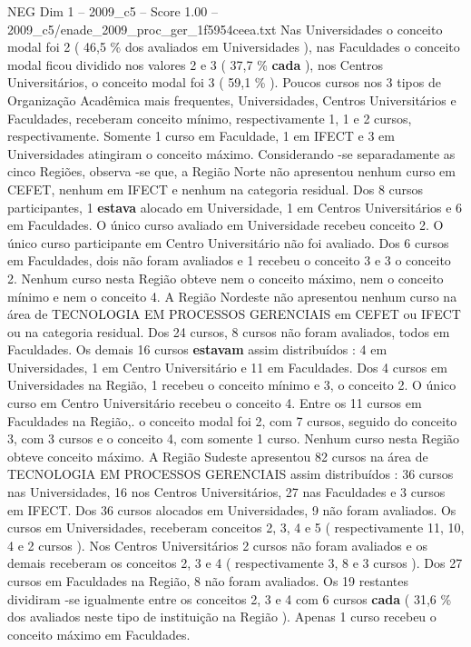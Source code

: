 \begin{textsample}{NEG Dim 1 – 2009\_c5 – Score 1.00 – 2009\_c5/enade\_2009\_proc\_ger\_1f5954ceea.txt}
Nas Universidades o conceito modal foi 2 ( 46,5 \% dos avaliados em Universidades ), nas Faculdades o conceito modal ficou dividido nos valores 2 e 3 ( 37,7 \% \textbf{cada} ), nos Centros Universitários, o conceito modal foi 3 ( 59,1 \% ).
Poucos cursos nos 3 tipos de Organização Acadêmica mais frequentes, Universidades, Centros Universitários e Faculdades, receberam conceito mínimo, respectivamente 1, 1 e 2 cursos, respectivamente.
Somente 1 curso em Faculdade, 1 em IFECT e 3 em Universidades atingiram o conceito máximo.
Considerando -se separadamente as cinco Regiões, observa -se que, a Região Norte não apresentou nenhum curso em CEFET, nenhum em IFECT e nenhum na categoria residual.
Dos 8 cursos participantes, 1 \textbf{estava} alocado em Universidade, 1 em Centros Universitários e 6 em Faculdades.
O único curso avaliado em Universidade recebeu conceito 2.
O único curso participante em Centro Universitário não foi avaliado.
Dos 6 cursos em Faculdades, dois não foram avaliados e 1 recebeu o conceito 3 e 3 o conceito 2.
Nenhum curso nesta Região obteve nem o conceito máximo, nem o conceito mínimo e nem o conceito 4.
A Região Nordeste não apresentou nenhum curso na área de TECNOLOGIA EM PROCESSOS GERENCIAIS em CEFET ou IFECT ou na categoria residual.
Dos 24 cursos, 8 cursos não foram avaliados, todos em Faculdades.
Os demais 16 cursos \textbf{estavam} assim distribuídos : 4 em Universidades, 1 em Centro Universitário e 11 em Faculdades.
Dos 4 cursos em Universidades na Região, 1 recebeu o conceito mínimo e 3, o conceito 2.
O único curso em Centro Universitário recebeu o conceito 4.
Entre os 11 cursos em Faculdades na Região,. o conceito modal foi 2, com 7 cursos, seguido do conceito 3, com 3 cursos e o conceito 4, com somente 1 curso.
Nenhum curso nesta Região obteve conceito máximo.
A Região Sudeste apresentou 82 cursos na área de TECNOLOGIA EM PROCESSOS GERENCIAIS assim distribuídos : 36 cursos nas Universidades, 16 nos Centros Universitários, 27 nas Faculdades e 3 cursos em IFECT.
Dos 36 cursos alocados em Universidades, 9 não foram avaliados.
Os cursos em Universidades, receberam conceitos 2, 3, 4 e 5 ( respectivamente 11, 10, 4 e 2 cursos ).
Nos Centros Universitários 2 cursos não foram avaliados e os demais receberam os conceitos 2, 3 e 4 ( respectivamente 3, 8 e 3 cursos ).
Dos 27 cursos em Faculdades na Região, 8 não foram avaliados.
Os 19 restantes dividiram -se igualmente entre os conceitos 2, 3 e 4 com 6 cursos \textbf{cada} ( 31,6 \% dos avaliados neste tipo de instituição na Região ).
Apenas 1 curso recebeu o conceito máximo em Faculdades.

\end{textsample}
